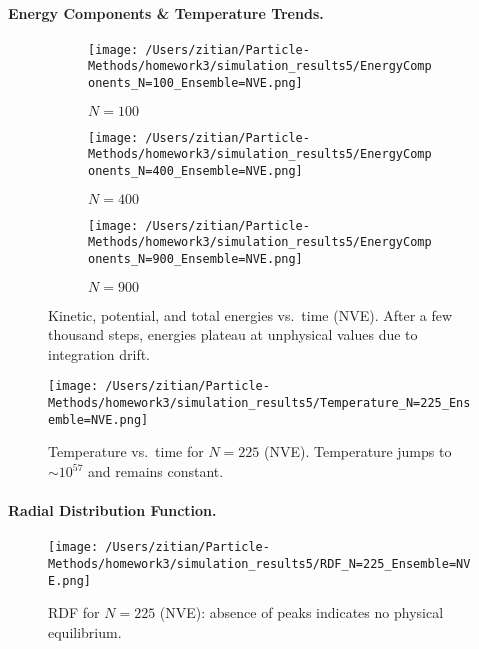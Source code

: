 \documentclass[11pt]{article}
\begin{document}
\paragraph{Energy Components \& Temperature Trends.}
\begin{figure}[H]
  \centering
  \begin{subfigure}{0.32\textwidth}
    \texttt{[image: /Users/zitian/Particle-Methods/homework3/simulation\_results5/EnergyComponents\_N=100\_Ensemble=NVE.png]}
    \caption{$N=100$}
  \end{subfigure}%
  \begin{subfigure}{0.32\textwidth}
    \texttt{[image: /Users/zitian/Particle-Methods/homework3/simulation\_results5/EnergyComponents\_N=400\_Ensemble=NVE.png]}
    \caption{$N=400$}
  \end{subfigure}%
  \begin{subfigure}{0.32\textwidth}
    \texttt{[image: /Users/zitian/Particle-Methods/homework3/simulation\_results5/EnergyComponents\_N=900\_Ensemble=NVE.png]}
    \caption{$N=900$}
  \end{subfigure}
  \caption{Kinetic, potential, and total energies vs.\ time (NVE).  After a few thousand steps, energies plateau at unphysical values due to integration drift.}
\end{figure}

\begin{figure}[H]
  \centering
  \texttt{[image: /Users/zitian/Particle-Methods/homework3/simulation\_results5/Temperature\_N=225\_Ensemble=NVE.png]}
  \caption{Temperature vs.\ time for $N=225$ (NVE).  Temperature jumps to $\sim 10^{57}$ and remains constant.}
\end{figure}

\paragraph{Radial Distribution Function.}
\begin{figure}[H]
  \centering
  \texttt{[image: /Users/zitian/Particle-Methods/homework3/simulation\_results5/RDF\_N=225\_Ensemble=NVE.png]}
  \caption{RDF for $N=225$ (NVE): absence of peaks indicates no physical equilibrium.}
\end{figure}
\end{document}
